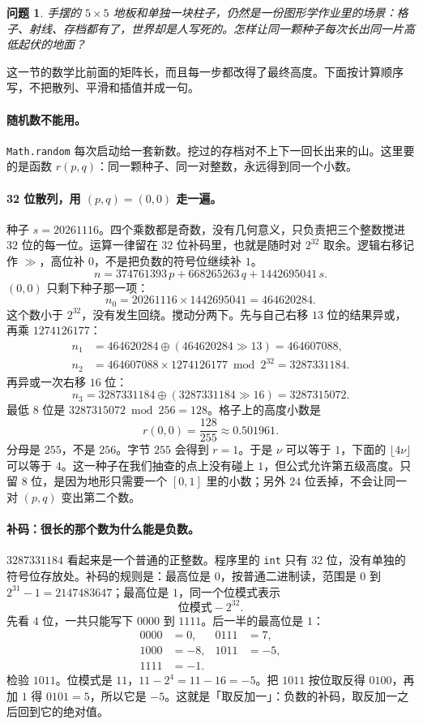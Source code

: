 \documentclass[12pt,a4paper]{article}
\theoremstyle{definition}
\theoremstyle{plain}
\newtheorem{problem}{问题}[section]
\theoremstyle{remark}
\begin{document}
\begin{problem}
手摆的 \(5\times 5\) 地板和单独一块柱子，仍然是一份图形学作业里的场景：格子、射线、存档都有了，世界却是人写死的。怎样让同一颗种子每次长出同一片高低起伏的地面？
\end{problem}

这一节的数学比前面的矩阵长，而且每一步都改得了最终高度。下面按计算顺序写，不把散列、平滑和插值并成一句。

\paragraph{随机数不能用。}
\texttt{Math.random} 每次启动给一套新数。挖过的存档对不上下一回长出来的山。这里要的是函数 \(r(p,q)\)：同一颗种子、同一对整数，永远得到同一个小数。

\paragraph{32 位散列，用 \((p,q)=(0,0)\) 走一遍。}
种子 \(s=20261116\)。四个乘数都是奇数，没有几何意义，只负责把三个整数搅进 \(32\) 位的每一位。运算一律留在 \(32\) 位补码里，也就是随时对 \(2^{32}\) 取余。逻辑右移记作 \(\gg\)，高位补 \(0\)，不是把负数的符号位继续补 \(1\)。
\[
n=374761393\,p+668265263\,q+1442695041\,s.
\]
\((0,0)\) 只剩下种子那一项：
\[
n_0=20261116\times 1442695041=464620284.
\]
这个数小于 \(2^{32}\)，没有发生回绕。搅动分两下。先与自己右移 \(13\) 位的结果异或，再乘 \(1274126177\)：
\begin{align*}
n_1&=464620284\oplus (464620284\gg 13)=464607088,\\
n_2&=464607088\times 1274126177\bmod 2^{32}=3287331184.
\end{align*}
再异或一次右移 \(16\) 位：
\[
n_3=3287331184\oplus (3287331184\gg 16)=3287315072.
\]
最低 \(8\) 位是 \(3287315072\bmod 256=128\)。格子上的高度小数是
\[
r(0,0)=\frac{128}{255}\approx 0.501961.
\]
分母是 \(255\)，不是 \(256\)。字节 \(255\) 会得到 \(r=1\)。于是 \(\nu\) 可以等于 \(1\)，下面的 \(\lfloor 4\nu\rfloor\) 可以等于 \(4\)。这一种子在我们抽查的点上没有碰上 \(1\)，但公式允许第五级高度。只留 \(8\) 位，是因为地形只需要一个 \([0,1]\) 里的小数；另外 \(24\) 位丢掉，不会让同一对 \((p,q)\) 变出第二个数。

\paragraph{补码：很长的那个数为什么能是负数。}
\(3287331184\) 看起来是一个普通的正整数。程序里的 \texttt{int} 只有 \(32\) 位，没有单独的符号位存放处。补码的规则是：最高位是 \(0\)，按普通二进制读，范围是 \(0\) 到 \(2^{31}-1=2147483647\)；最高位是 \(1\)，同一个位模式表示
\[
\text{位模式}-2^{32}.
\]
先看 \(4\) 位，一共只能写下 \(0000\) 到 \(1111\)。后一半的最高位是 \(1\)：
\begin{align*}
0000&=0,&
0111&=7,\\
1000&=-8,&
1011&=-5,\\
1111&=-1.
\end{align*}
检验 \(1011\)。位模式是 \(11\)，\(11-2^4=11-16=-5\)。把 \(1011\) 按位取反得 \(0100\)，再加 \(1\) 得 \(0101=5\)，所以它是 \(-5\)。这就是「取反加一」：负数的补码，取反加一之后回到它的绝对值。
\end{document}
